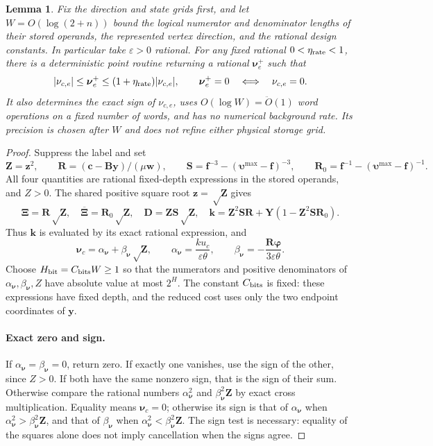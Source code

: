 \documentclass[11pt]{article}
\newtheorem{lemma}[theorem]{Lemma}
\theoremstyle{remark}
\newcommand{\BB}{\mathbf B}
\newcommand{\cc}{\mathbf c}
\newcommand{\ff}{\mathbf f}
\newcommand{\ww}{\mathbf w}
\newcommand{\yy}{\mathbf y}
\newcommand{\zz}{\mathbf z}
\newcommand{\vvu}{\boldsymbol{\upsilon}}
\newcommand{\XXi}{\boldsymbol{\Xi}}
\newcommand{\XXibar}{\overline{\boldsymbol{\Xi}}}
\newcommand{\DD}{\mathbf D}
\newcommand{\RR}{\mathbf R}
\renewcommand{\SS}{\mathbf S}
\newcommand{\YY}{\mathbf Y}
\newcommand{\ZZ}{\mathbf Z}
\newcommand{\kk}{\mathbf k}
\newcommand{\nnu}{\boldsymbol{\nu}}
\newcommand{\pphi}{\boldsymbol{\varphi}}
\renewcommand{\O}{\ddot{O}}
\begin{document}
\begin{lemma}
\label{lem:ram-algebraic-rate-enclosure}
Fix the direction and state grids first, and let $W=O(\log(2+n))$ bound the
logical numerator and denominator lengths of their stored operands, the
represented vertex direction, and the rational design constants.
In particular take $\varepsilon>0$ rational.
For any fixed rational $0<\eta_{\rm rate}<1$, there is a deterministic point
routine returning a rational $\nnu_e^+$ such that
\[
 |\nu_{c,e}|\le\nnu_e^+\le
       (1+\eta_{\rm rate})|\nu_{c,e}|,
 \qquad \nnu_e^+=0\quad\Longleftrightarrow\quad\nu_{c,e}=0.
\]
It also determines the exact sign of $\nu_{c,e}$, uses $O(\log W)=\O(1)$ word
operations on a fixed number of words, and has no numerical background rate.
Its precision is chosen after $W$ and does not refine either physical storage
grid.
\end{lemma} \begin{proof} Suppress the label and set
\[
 \ZZ=\zz^2,\qquad \RR=(\cc-\BB\yy)/(\mu\ww),\qquad
 \SS=\ff^{-3}-(\vvu^{\max}-\ff)^{-3},\qquad
 \RR_0=\ff^{-1}-(\vvu^{\max}-\ff)^{-1}.
\]
All four quantities are rational fixed-depth expressions in the stored operands,
and $Z>0$.
The shared positive square root $\zz=\sqrt\ZZ$ gives
\[
 \XXi=\RR\sqrt\ZZ,\quad \XXibar=\RR_0\sqrt\ZZ,\quad \DD=\ZZ\SS\sqrt\ZZ,
 \quad \kk=\ZZ^2\SS\RR+\YY(1-\ZZ^2\SS\RR_0).
\]
Thus $\kk$ is evaluated by its exact rational expression, and
\[
 \nnu_c=\alpha_{\nnu}+\beta_{\nnu}\sqrt\ZZ,\qquad
 \alpha_{\nnu}=\frac{ku_c}{\varepsilon\theta},\qquad
 \beta_{\nnu}=-\frac{\RR\pphi}{3\varepsilon\theta}.
\]
Choose $H_{\rm bit}=C_{\rm bits}W\ge1$ so that the numerators and positive denominators of
$\alpha_{\nnu},\beta_{\nnu},Z$ have absolute value at most $2^H$.
The constant $C_{\rm bits}$ is fixed: these expressions have fixed depth, and
the reduced cost uses only the two endpoint coordinates of $\yy$.

\paragraph{Exact zero and sign.}
If $\alpha_{\nnu}=\beta_{\nnu}=0$, return zero.
If exactly one vanishes, use the sign of the other, since $Z>0$.
If both have the same nonzero sign, that is the sign of their sum.
Otherwise compare the rational numbers $\alpha_{\nnu}^2$ and $\beta_{\nnu}^2\ZZ$ by exact cross
multiplication.
Equality means $\nnu_c=0$; otherwise its sign is that of $\alpha_{\nnu}$ when $\alpha_{\nnu}^2>\beta_{\nnu}^2\ZZ$, and
that of $\beta_{\nnu}$ when $\alpha_{\nnu}^2<\beta_{\nnu}^2\ZZ$.
The sign test is necessary: equality of the squares alone does not imply
cancellation when the signs agree.


\end{proof}
\end{document}
